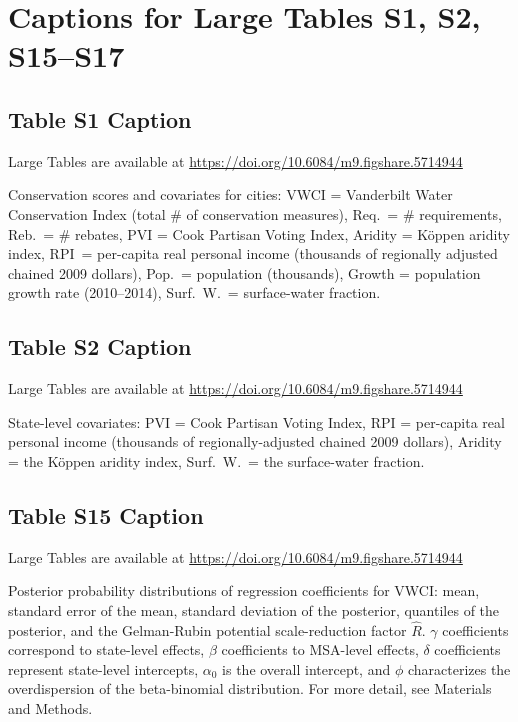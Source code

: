 \documentclass[draft]{agujournal}\usepackage{knitr}
\begin{document}
%
%
\iffalse
%
\section*{Captions for Large Tables S1, S2, S15--S17}
\subsection*{Table S1 Caption}
\setcounter{table}{0}%
\begin{table}[H]
\centering
Large Tables are available at \url{https://doi.org/10.6084/m9.figshare.5714944}
\caption{Conservation scores and covariates for  cities: VWCI = Vanderbilt Water Conservation Index (total \# of conservation measures), Req.\ = \# requirements, Reb.\ = \# rebates, PVI = Cook Partisan Voting Index, Aridity = K\"oppen aridity index, RPI\ = per-capita real personal income (thousands of regionally adjusted chained 2009 dollars), Pop.\ = population (thousands), Growth = population growth rate (2010--2014), Surf.\ W.\ = surface-water fraction.}
\end{table}


\subsection*{Table S2 Caption}
\setcounter{table}{1}%
\begin{table}[H]
\centering
Large Tables are available at \url{https://doi.org/10.6084/m9.figshare.5714944}
\caption{State-level covariates: PVI = Cook Partisan Voting Index, RPI = per-capita real personal income (thousands of regionally-adjusted chained 2009 dollars), Aridity = the K\"oppen aridity index, Surf.\ W.\ = the surface-water fraction.}
\end{table}


\subsection*{Table S15 Caption}
\setcounter{table}{14}%
\begin{table}[H]
\centering
Large Tables are available at \url{https://doi.org/10.6084/m9.figshare.5714944}
\caption{Posterior probability distributions of regression coefficients for VWCI: mean, standard error of the mean, standard deviation of the posterior, quantiles of the posterior, and the Gelman-Rubin potential scale-reduction factor $\hat R$. $\gamma$ coefficients correspond to state-level effects, $\beta$ coefficients to MSA-level effects, $\delta$ coefficients represent state-level intercepts, $\alpha_0$ is the overall intercept, and $\phi$ characterizes the overdispersion of the beta-binomial distribution. For more detail, see Materials and Methods.}
\end{table}
\end{document}
